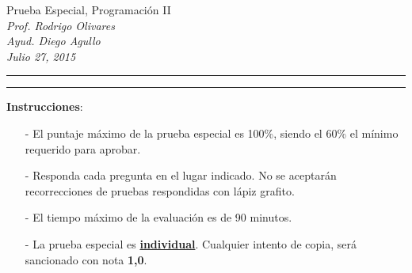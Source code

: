 \documentclass[10pt]{article}
\begin{document}
\begin{center}
    {\Large Prueba Especial, Programaci\'on II} \\
    \emph{\small Prof. Rodrigo Olivares} \\
    \emph{\small Ayud. Diego Agullo} \\
    \emph{\scriptsize Julio 27, 2015}
\end{center}
\vspace*{-35pt}
\begin{center}
    \rule{1\textwidth}{.3pt}
\end{center}
\vspace*{-42pt}
\begin{center}
    \rule{1\textwidth}{2pt}
\end{center}

\vspace*{-15pt}
\textbf{Instrucciones}:
\vspace*{-15pt}

\begin{itemize}
    \item[-] El puntaje m\'aximo de la prueba especial es 100\%, siendo el 60\% el m\'inimo requerido para aprobar.
	\item[-] Responda cada pregunta en el lugar indicado. No se aceptar\'an recorrecciones de pruebas respondidas con l\'apiz grafito.
	\item[-] El tiempo m\'aximo de la evaluaci\'on es de 90 minutos.
    \item[-] La prueba especial es \underline{\textbf{individual}}. Cualquier intento de copia, ser\'a sancionado con nota \textbf{1,0}.
\end{itemize}
\vspace*{-20pt}
\end{document}
